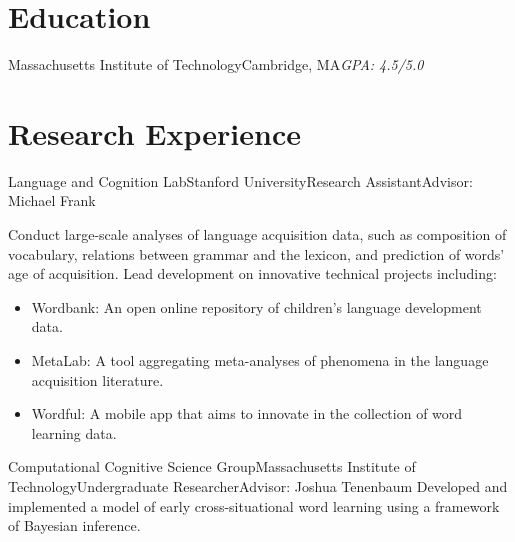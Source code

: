 \documentclass[11pt,letter]{moderncv}
\begin{document}
\makecvtitle

\vspace*{-2\baselineskip}

\section{Education}

{Massachusetts Institute of Technology}{Cambridge, MA}{\textit{GPA: 4.5/5.0}}{}


\vspace*{0.25em}

\section{Research Experience}


{Language and Cognition Lab}{Stanford University}{\newline Research Assistant}{Advisor: Michael Frank}{
%
Conduct large-scale analyses of language acquisition data, such as composition of vocabulary, relations between grammar and the lexicon, and prediction of words' age of acquisition. Lead development on innovative technical projects including:
\begin{itemize}
\item Wordbank: An open online repository of children's language development data.
\item MetaLab: A tool aggregating meta-analyses of phenomena in the language acquisition literature.
\item Wordful: A mobile app that aims to innovate in the collection of word learning data.
\end{itemize}
%
}
\vspace*{0.2em}

{Computational Cognitive Science Group}{Massachusetts Institute of Technology}{Undergraduate Researcher}{Advisor: Joshua Tenenbaum}{
%
Developed and implemented a model of early cross-situational word learning using a framework of Bayesian inference.
%
}
\vspace*{0.2em}
\end{document}

